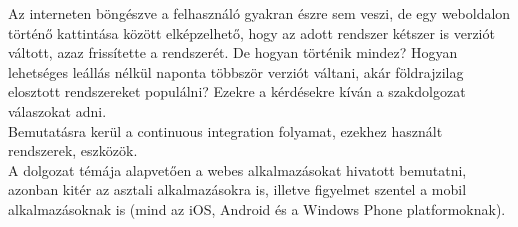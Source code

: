 Az interneten böngészve a felhasználó gyakran észre sem veszi, de egy weboldalon történő kattintása között elképzelhető, hogy az adott rendszer kétszer is verziót váltott, azaz frissítette a rendszerét. De hogyan történik mindez? Hogyan lehetséges leállás nélkül naponta többször verziót váltani, akár földrajzilag elosztott rendszereket populálni? Ezekre a kérdésekre kíván a szakdolgozat válaszokat adni.
\\
Bemutatásra kerül a continuous integration folyamat, ezekhez használt rendszerek, eszközök.
\\
A dolgozat témája alapvetően a webes alkalmazásokat hivatott bemutatni, azonban kitér az asztali alkalmazásokra is, illetve figyelmet szentel a mobil alkalmazásoknak is (mind az iOS, Android és a Windows Phone platformoknak).